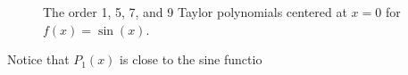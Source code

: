 \begin{figure}[h]
\begin{center}
         
\caption{The order 1, 5, 7, and 9 Taylor polynomials centered at $x = 0$ for $f(x) = \sin(x)$.} \label{F:8.5.Taylor1to9}
\end{center}
\end{figure}


Notice that $P_1(x)$ is close to the sine functio